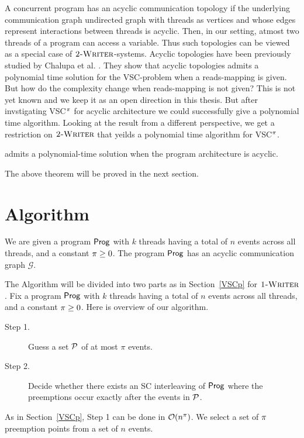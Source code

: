 A concurrent program has an acyclic communication topology if the underlying  communication graph undirected graph with threads as vertices and whose edges represent interactions between threads is acyclic. Then,   in our setting, atmost two threads of a program can access a variable. Thus such topologies can be viewed as a special case of $\textsc{2-Writer}$-systems. Acyclic  topologies have been previously studied by Chalupa et al. \cite{Data-centricDPOR}.  They show that acyclic topologies admits a polynomial time solution for the VSC-problem when a reads-mapping is given. 
But how do the complexity change when reads-mapping is not given? This is not yet known and we keep it as an open direction in this thesis. But after  invstigating VSC$^\pi$  for acyclic architecture we could successfully give a polynomial time algorithm. Looking at the result from a different perspective, we get a restriction on $\textsc{2-Writer}$ that yeilds a polynomial time algorithm for VSC$^\pi$.

\begin{theorem} \label{th:scacyclic}
\vscp  admits a polynomial-time solution  when the program architecture is acyclic.  
\end{theorem}

The above theorem will be proved in the next section.

\section{Algorithm}

We are given a program $\mathsf{Prog}$ with $k$ threads having a total of $n$ events across all threads, 
and a constant $\pi \geq 0$. The program $\mathsf{Prog}$ has an acyclic communication graph $\mathcal{G}$.

The Algorithm will be divided into two parts as in Section~\ref{VSCp} for $\textsc{1-Writer}$. Fix a program $\mathsf{Prog}$ with $k$ threads having a total of $n$ events across all threads, 
and a constant $\pi \geq 0$. Here is  overview of our algorithm. 
\begin{description}
\item[Step 1.] Guess a set $\mathcal{P}$ of at most $\pi$ events.
\item[Step 2.] Decide whether there exists an SC interleaving of $\mathsf{Prog}$ where the preemptions occur exactly after the events in $\mathcal{P}$.
\end{description}
As in Section~\ref{VSCp}, Step 1 can be done in $\mathcal{O}(n^{\pi})$. We select a set of $\pi$ preemption points from a set of $n$ events. 

